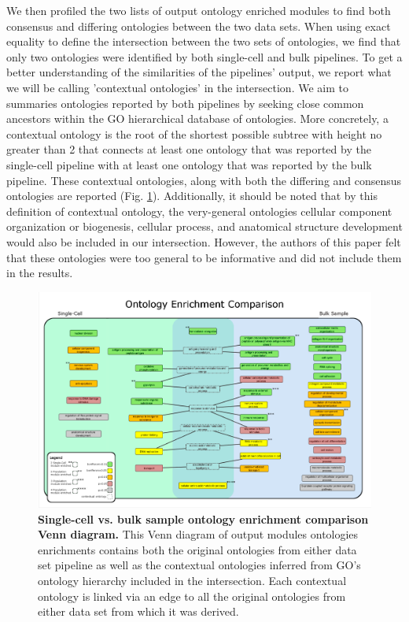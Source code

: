 \documentclass[10pt,letterpaper]{article}
\begin{document}
We then profiled the two lists of output ontology enriched modules to find both consensus and differing ontologies between the two data sets. When using exact equality to define the intersection between the two sets of ontologies, we find that only two ontologies were identified by both single-cell and bulk pipelines. To get a better understanding of the similarities of the pipelines' output, we report what we will be calling 'contextual ontologies' in the intersection. We aim to summaries ontologies reported by both pipelines by seeking close common ancestors within the GO hierarchical database of ontologies. More concretely, a contextual ontology is the root of the shortest possible subtree with height no greater than 2 that connects at least one ontology that was reported by the single-cell pipeline with at least one ontology that was reported by the bulk pipeline. These contextual ontologies, along with both the differing and consensus ontologies are reported (Fig. \ref{fig:venn}). 
Additionally, it should be noted that by this definition of contextual ontology, the very-general ontologies cellular component organization or biogenesis, cellular process, and anatomical structure development would also be included in our intersection. However, the authors of this paper felt that these ontologies were too general to be informative and did not include them in the results.

\begin{figure}
\centering
\includegraphics[width=180mm]{Figures/PopVsSCToCytoscape}
\caption{\textbf{Single-cell vs. bulk sample ontology enrichment comparison Venn diagram.} This Venn diagram of output modules ontologies enrichments contains both the original ontologies from either data set pipeline as well as the contextual ontologies inferred from GO's ontology hierarchy included in the intersection. Each contextual ontology is linked via an edge to all the original ontologies from either data set from which it was derived.}
\label{fig:venn}
\end{figure}
\end{document}
